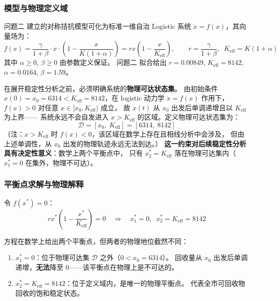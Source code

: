 \documentclass[12pt,a4paper]{ctexart}
\begin{document}
\begin{table}[htbp]
\subsubsection{模型与物理定义域}

问题二 建立的对称拮抗模型可化为标准一维自治 Logistic 系统
$\dot{x} = f(x)$，其向量场为：
\begin{equation}\label{eq:ode_q3}
f(x) = \frac{\gamma}{1+\beta} \cdot x \cdot \left(1 - \frac{x}{K(1+\alpha)}\right)
     = r x \left(1 - \frac{x}{K_{\text{eff}}}\right), \qquad
r = \frac{\gamma}{1+\beta},\;\; K_{\text{eff}} = K(1+\alpha)
\end{equation}
其中 $\alpha \geq 0$, $\beta \geq 0$ 由参数定义保证。
问题二 拟合给出 $r = 0.00849$, $K_{\text{eff}} = 8142$,
$\alpha = 0.0164$, $\beta = 1.59$。

在展开稳定性分析之前，必须明确系统的\textbf{物理可达状态集}。
由初始条件 $x(0) = x_0 = 6314 < K_{\text{eff}} = 8142$，在 logistic 动力学
$\dot{x} = f(x)$ 作用下，$f(x) > 0$ 对任意 $x \in [x_0, K_{\text{eff}})$ 成立，
故 $x(t)$ 从 $x_0$ 出发后单调递增且以 $K_{\text{eff}}$ 为上界——
系统永远不会自发进入 $x > K_{\text{eff}}$ 的区域。定义物理可达状态集为：
\begin{equation}
\mathcal{D} = [x_0,\; K_{\text{eff}}] = [6314,\; 8142]
\end{equation}
（注：$x > K_{\text{eff}}$ 时 $f(x) < 0$，该区域在数学上存在且相线分析中会涉及，
但由上述单调性，从 $x_0$ 出发的物理轨迹永远无法到达。）
\textbf{这一约束对后续稳定性分析具有决定性意义}：数学上两个平衡点中，
只有 $x^*_2 = K_{\text{eff}}$ 落在物理可达集内（$x^*_1 = 0$ 在集外，物理不可达）。

\subsubsection{平衡点求解与物理解释}

令 $f(x^*) = 0$：
\begin{equation}
r x^* \left(1 - \frac{x^*}{K_{\text{eff}}}\right) = 0
\quad\Rightarrow\quad x^*_1 = 0,\;\; x^*_2 = K_{\text{eff}} = 8142
\end{equation}

方程在数学上给出两个平衡点，但两者的物理地位截然不同：
\begin{enumerate}
  \item $x^*_1 = 0$：位于物理可达集 $\mathcal{D}$ 之外（$0 < x_0 = 6314$）。
        回收量从 $x_0$ 出发后单调递增，\textbf{无法}降至 $0$——该平衡点在物理上是不可达的。
  \item $x^*_2 = K_{\text{eff}} = 8142$：位于定义域内，是唯一的物理平衡点。
        代表全市可回收物回收的饱和稳定状态。
\end{enumerate}


\end{table}
\end{document}
